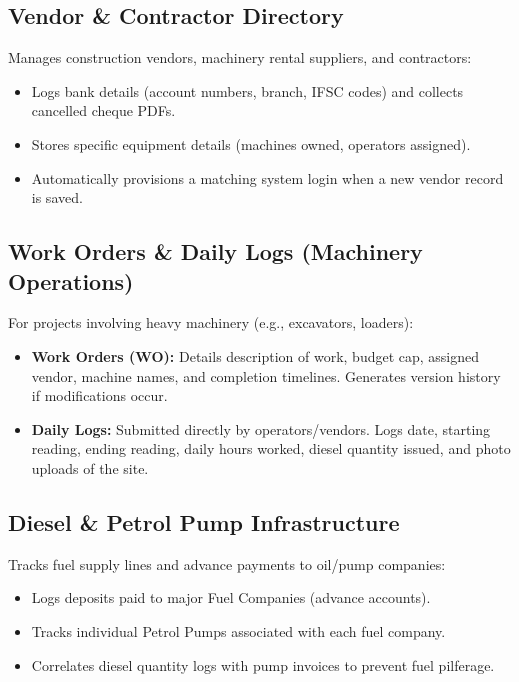 \documentclass[11pt,a4paper]{article}
\begin{document}
\subsection{Vendor \& Contractor Directory}
Manages construction vendors, machinery rental suppliers, and contractors:
\begin{itemize}
    \item Logs bank details (account numbers, branch, IFSC codes) and collects cancelled cheque PDFs.
    \item Stores specific equipment details (machines owned, operators assigned).
    \item Automatically provisions a matching system login when a new vendor record is saved.
\end{itemize}

\subsection{Work Orders \& Daily Logs (Machinery Operations)}
For projects involving heavy machinery (e.g., excavators, loaders):
\begin{itemize}
    \item \textbf{Work Orders (WO):} Details description of work, budget cap, assigned vendor, machine names, and completion timelines. Generates version history if modifications occur.
    \item \textbf{Daily Logs:} Submitted directly by operators/vendors. Logs date, starting reading, ending reading, daily hours worked, diesel quantity issued, and photo uploads of the site.
\end{itemize}

\subsection{Diesel \& Petrol Pump Infrastructure}
Tracks fuel supply lines and advance payments to oil/pump companies:
\begin{itemize}
    \item Logs deposits paid to major Fuel Companies (advance accounts).
    \item Tracks individual Petrol Pumps associated with each fuel company.
    \item Correlates diesel quantity logs with pump invoices to prevent fuel pilferage.
\end{itemize}
\end{document}
